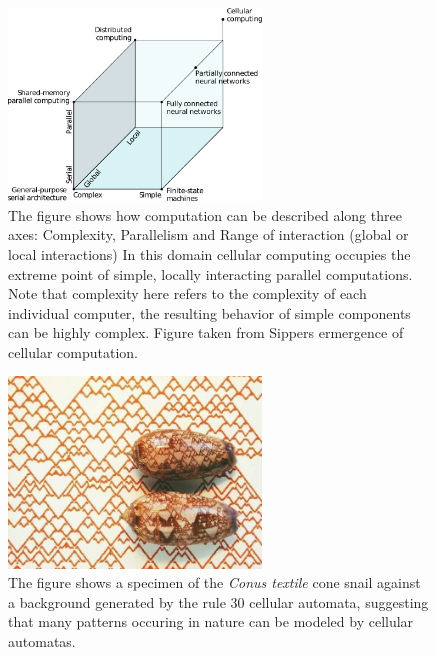 \begin{figure}[h!]
  \centering
  \includegraphics[width=0.6\textwidth]{fig/sipperComp.png}
  \caption[Computation summarized along three axes]{
    The figure shows how computation can be described along three axes:
    Complexity, Parallelism and Range of interaction (global or local
    interactions)
    In this domain cellular computing occupies the extreme point of simple,
    locally interacting parallel computations.
    Note that complexity here refers to the complexity of each individual
    computer, the resulting behavior of simple components can be highly complex.
    Figure taken from Sippers ermergence of cellular computation.\cite{SIPP99}
    }
  \label{figSipperClass}
\end{figure}
\begin{figure}[h!]
  \centering
  \includegraphics[width=0.6\textwidth]{fig/CApattern.png}
  \caption[The pattern of a snail compared to a cellular automata]{
    The figure shows a specimen of the \emph{Conus textile} cone snail
    against a background generated by the rule 30 cellular automata, suggesting
    that many patterns occuring in nature can be modeled by cellular automatas.
    }
  \label{figCX}
\end{figure}
